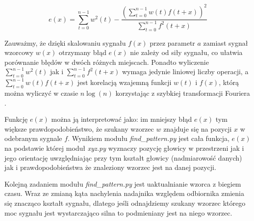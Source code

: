 \[
  e(x) = \sum_{t=0}^{n-1}  w^2(t)  - \frac {(\sum\limits_{t=0}^{n-1}  w(t) f(t+x) )^2 } { \sum\limits_{t=0}^{n-1} f^2(t+x)}
\]

Zauważmy, że dzięki skalowaniu sygnału $f(x)$ przez parametr $a$ zamiast sygnał wzorcowy $w(x)$
otrzymany błąd $e(x)$ nie zależy od siły sygnału, co ułatwia porównanie błędów w dwóch różnych miejscach.
Ponadto wyliczenie $ \sum\limits_{t=0}^{n-1}  w^2(t) $ 
jak i $\sum\limits_{t=0}^{n-1} f^2(t+x)$ wymaga jedynie liniowej liczby operacji, a 
 $\sum\limits_{t=0}^{n-1}  w(t) f(t+x)  $ jest korelacją wzajemną funkcji $w(t)$ i $f(x)$, którą
 można wyliczyć w czasie $n \log(n)$ korzystając z szybkiej transformacji Fouriera \cite{bib:FFT_correlation}.
 
 Funkcję $e(x)$  można ją interpretować jako:
 im mniejszy błąd $e(x)$ tym większe prawdopodobieństwo, że szukany wzorzec $w$ znajduje się na pozycji $x$ w 
 odebranym sygnale $f$. 
 Wynikiem modułu \textit{find\_pattern.py} jest cała funkcja, $e(x)$ na podstawie której moduł \textit{xyz.py}
 wyznaczy pozycję głowicy w przestrzeni jak i jego orientację uwzględniając przy tym 
 kształt głowicy (nadmiarowość danych) jak i prawdopodobieństwa że znaleziony wzorzec jest na danej pozycji.
 
 Kolejną zadaniem modułu \textit{find\_pattern.py} jest uaktualnianie wzorca z biegiem czasu.
 Wraz ze zmianą kąta nachylenia nadajnika względem odbiornika zmienia się znacząco kształt sygnału,
 dlatego jeśli odnajdziemy szukany wzorzec którego moc sygnału jest wystarczająco silna to
 podmieniany jest na niego wzorzec.
 
 
